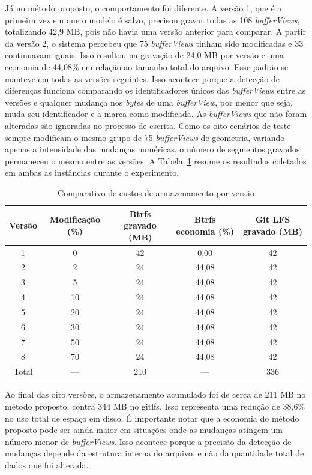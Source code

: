 Já no método proposto, o comportamento foi diferente. A versão 1, que é a primeira
vez em que o modelo é salvo, precisou gravar todas as 108 \textit{bufferViews},
totalizando 42,9 MB, pois não havia uma versão anterior para comparar. A partir da
versão 2, o sistema percebeu que 75 \textit{bufferViews} tinham sido modificadas e
33 continuavam iguais. Isso resultou na gravação de 24,0 MB por versão e uma
economia de 44,08\% em relação ao tamanho total do arquivo. Esse padrão se manteve
em todas as versões seguintes. Isso acontece porque a detecção de diferenças
funciona comparando os identificadores únicos das \textit{bufferViews} entre as
versões e qualquer mudança nos \textit{bytes} de uma \textit{bufferView}, por menor
que seja, muda seu identificador e a marca como modificada. As \textit{bufferViews}
que não foram alteradas são ignoradas no processo de escrita. Como os oito cenários
de teste sempre modificam o mesmo grupo de 75 \textit{bufferViews} de geometria,
variando apenas a intensidade das mudanças numéricas, o número de segmentos gravados
permaneceu o mesmo entre as versões. A Tabela~\ref{tab:resultados-exp1} resume os
resultados coletados em ambas as instâncias durante o experimento.

\begin{table}[htb]
  \centering
  \caption{\label{tab:resultados-exp1}Comparativo de custos de armazenamento por versão}
  \begin{tabular}{ccccc}
    \toprule
    \textbf{Versão} & \textbf{Modificação (\%)} & \textbf{Btrfs gravado (MB)} &
    \textbf{Btrfs economia (\%)} & \textbf{Git LFS gravado (MB)} \\
    \midrule
    1 & 0  & 42 & 0,00  & 42 \\
    2 & 2  & 24 & 44,08 & 42 \\
    3 & 5  & 24 & 44,08 & 42 \\
    4 & 10 & 24 & 44,08 & 42 \\
    5 & 20 & 24 & 44,08 & 42 \\
    6 & 30 & 24 & 44,08 & 42 \\
    7 & 50 & 24 & 44,08 & 42 \\
    8 & 70 & 24 & 44,08 & 42 \\
    \midrule
    Total & --- & 210 & --- & 336 \\
    \bottomrule
  \end{tabular}
\end{table}

Ao final das oito versões, o armazenamento acumulado foi de cerca de 211 MB no
método proposto, contra 344 MB no \gls{gitlfs}. Isso representa uma redução de
38,6\% no uso total de espaço em disco. É importante notar que a economia do método
proposto pode ser ainda maior em situações onde as mudanças atingem um número menor
de \textit{bufferViews}. Isso acontece porque a precisão da detecção de mudanças
depende da estrutura interna do arquivo, e não da quantidade total de dados que foi
alterada.

